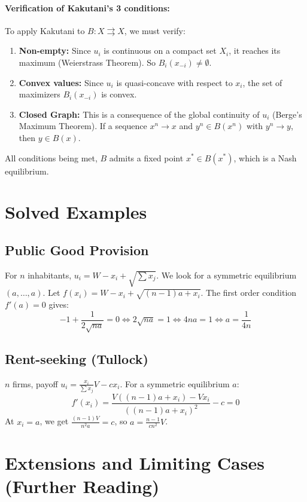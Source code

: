 \paragraph{Verification of Kakutani's 3 conditions:}
To apply Kakutani to $B : X \rightrightarrows X$, we must verify:
\begin{enumerate}
    \item \textbf{Non-empty:} Since $u_i$ is continuous on a compact set $X_i$, it reaches its maximum (Weierstrass Theorem). So $B_i(x_{-i}) \ne \emptyset$.
    \item \textbf{Convex values:} Since $u_i$ is quasi-concave with respect to $x_i$, the set of maximizers $B_i(x_{-i})$ is convex.
    \item \textbf{Closed Graph:} This is a consequence of the global continuity of $u_i$ (Berge's Maximum Theorem). If a sequence $x^n \to x$ and $y^n \in B(x^n)$ with $y^n \to y$, then $y \in B(x)$.
\end{enumerate}
All conditions being met, $B$ admits a fixed point $x^* \in B(x^*)$, which is a Nash equilibrium.

\section{Solved Examples}

\subsection{Public Good Provision}
For $n$ inhabitants, $u_i = W - x_i + \sqrt{\sum x_j}$. We look for a symmetric equilibrium $(a, \dots, a)$.
Let $f(x_i) = W - x_i + \sqrt{(n-1)a + x_i}$. The first order condition $f'(a) = 0$ gives:
$$-1 + \frac{1}{2\sqrt{na}} = 0 \iff 2\sqrt{na} = 1 \iff 4na = 1 \iff a = \frac{1}{4n}$$

\subsection{Rent-seeking (Tullock)}
$n$ firms, payoff $u_i = \frac{x_i}{\sum x_j}V - cx_i$. For a symmetric equilibrium $a$:
$$f'(x_i) = \frac{V((n-1)a + x_i) - Vx_i}{((n-1)a + x_i)^2} - c = 0$$
At $x_i = a$, we get $\frac{(n-1)V}{n^2 a} = c$, so $a = \frac{n-1}{cn^2}V$.

\section{Extensions and Limiting Cases (Further Reading)}

